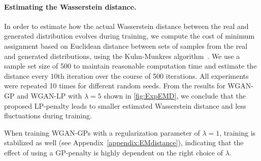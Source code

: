 \documentclass{article} %
\begin{document}
\paragraph{Estimating the Wasserstein distance.}

In order to estimate how the actual Wasserstein distance between the real and generated distribution evolves during training, we compute the cost of minimum assignment based on Euclidean distance between sets of samples from the real and generated distributions, using the Kuhn-Munkres algorithm~\citep{Kuhn1955}.
We use a sample set size of 500 to maintain reasonable computation time and estimate the distance every 10th iteration over the course of 500 iterations. All experiments were repeated 10 times for different random seeds.
From the results for WGAN-GP and WGAN-LP with $\lambda = 5$ shown in \autoref{fig:ExpEMD}, we conclude that the proposed LP-penalty leads to smaller estimated Wasserstein distance and less fluctuations during training.

When training WGAN-GPs with a regularization parameter of $\lambda=1$, training is stabilized as well (see Appendix~\ref{appendix:EMdistance}), indicating that the effect of using a GP-penalty is highly dependent on the right choice of $\lambda$. %
\end{document}
